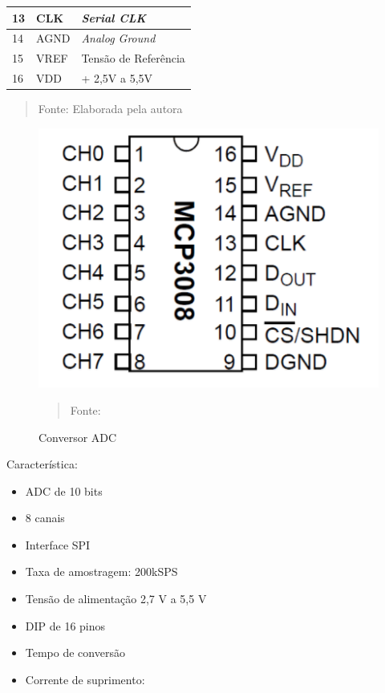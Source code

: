\documentclass[12pt, a4paper]{article}
\begin{document}
\begin{table}[]
\begin{center}
\begin{tabular}{|l|l|l|}
13                                   & CLK                                      & \textit{Serial CLK}                     \\ \hline
14                                   & AGND                                     & \textit{Analog Ground}                  \\ \hline
15                                   & VREF                                     & Tensão de Referência                    \\ \hline
16                                   & VDD                                      & + 2,5V a 5,5V                           \\ \hline
\end{tabular}
\end{center}
 \vspace*{\fill} 
            \begin{quote}
            \centering 
            \vspace{12pt}Fonte: Elaborada pela autora 
            \end{quote}
            \vspace*{\fill}
			\label{fig:ramcor}
\end{table}


\begin{figure}[H]
\begin{center}
			\caption{Conversor ADC}
			\includegraphics[width=.5\textwidth]{Figuras/mcp3008.PNG}
            \vspace*{\fill} 
            \begin{quote} 
            \centering 
           Fonte: \cite{analogica}
            \end{quote}
            \vspace*{\fill}
			\label{fig:cadc}
\end{center}
\end{figure}

Característica:

\begin{itemize}
\item ADC de 10 bits
\item 8 canais
\item Interface SPI
\item Taxa de amostragem: 200kSPS
\item Tensão de alimentação 2,7 V a 5,5 V
\item DIP de 16 pinos
\item Tempo de conversão %
\item Corrente de suprimento: %

\end{itemize}
\end{document}
